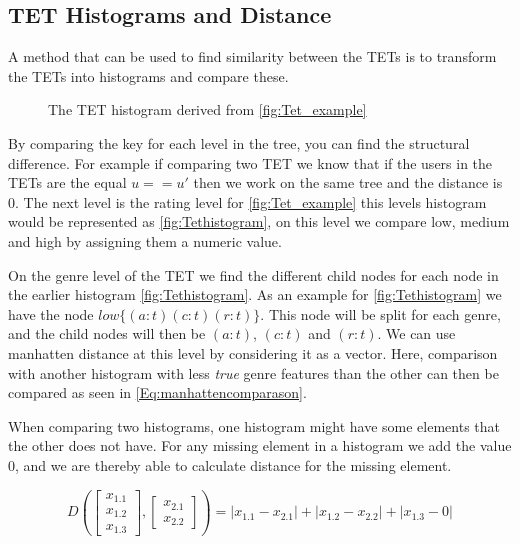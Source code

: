 \subsection{TET Histograms and Distance}
	A method that can be used to find similarity between the TETs is to transform the TETs into histograms and compare these\cite{JAEGER201330}. 
	\begin{figure}[H]
		\centering
		\begin{adjustbox}{width=0.5\textwidth}
			
		\end{adjustbox}
		\caption{The TET histogram derived from \autoref{fig:Tet_example}}
		\label{fig:Tethistogram}
	\end{figure}

	By comparing the key for each level in the tree, you can find the structural difference. For example if comparing two TET we know that if the users in the TETs are the equal $u == u'$ then we work on the same tree and the distance is $0$. The next level is the rating level for \autoref{fig:Tet_example} this levels histogram would be represented as \autoref{fig:Tethistogram}, on this level we compare low, medium and high by assigning them a numeric value.
	
	On the genre level of the TET we find the different child nodes for each node in the earlier histogram \autoref{fig:Tethistogram}. As an example for  \autoref{fig:Tethistogram} we have the node  $low\{(a:t)(c:t)(r:t)\}$. This node will be split for each genre,  and the child nodes will then be  $(a:t)$, $(c:t)$ and $(r:t)$. We can use manhatten distance at this level by considering it as a vector. Here, comparison with another histogram with less \textit{true} genre features than the other can then be compared as seen in \autoref{Eq:manhattencomparason}\cite{singh2013k}.
	
	When comparing two histograms, one histogram might have some elements that the other does not have. For any missing element in a histogram we add the value $0$, and we are thereby able to calculate distance for the missing element.
	
	\begin{equation}\label{Eq:manhattencomparason}
	D(\begin{bmatrix}
	x_{1.1} \\
	x_{1.2} \\
	x_{1.3}
	\end{bmatrix},
	\begin{bmatrix}
	x_{2.1} \\
	x_{2.2}
	\end{bmatrix})= |x_{1.1} - x_{2.1}| + |x_{1.2} - x_{2.2}| + |x_{1.3} - 0|
	\end{equation}
	
